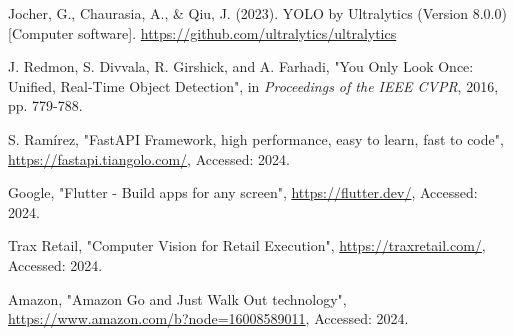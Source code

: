 \documentclass[12pt,A4]{report}
\begin{document}
\singlespace
{}
\begin{thebibliography}{}
    Jocher, G., Chaurasia, A., \& Qiu, J. (2023). YOLO by Ultralytics (Version 8.0.0) [Computer software]. \url{https://github.com/ultralytics/ultralytics}
    
    J. Redmon, S. Divvala, R. Girshick, and A. Farhadi, "You Only Look Once: Unified, Real-Time Object Detection", in \textit{Proceedings of the IEEE CVPR}, 2016, pp. 779-788.
    
    S. Ramírez, "FastAPI Framework, high performance, easy to learn, fast to code", \url{https://fastapi.tiangolo.com/}, Accessed: 2024.
    
    Google, "Flutter - Build apps for any screen", \url{https://flutter.dev/}, Accessed: 2024.
    
    Trax Retail, "Computer Vision for Retail Execution", \url{https://traxretail.com/}, Accessed: 2024.
    
    Amazon, "Amazon Go and Just Walk Out technology", \url{https://www.amazon.com/b?node=16008589011}, Accessed: 2024.
\end{thebibliography}


\appendix
{}


\end{document}
